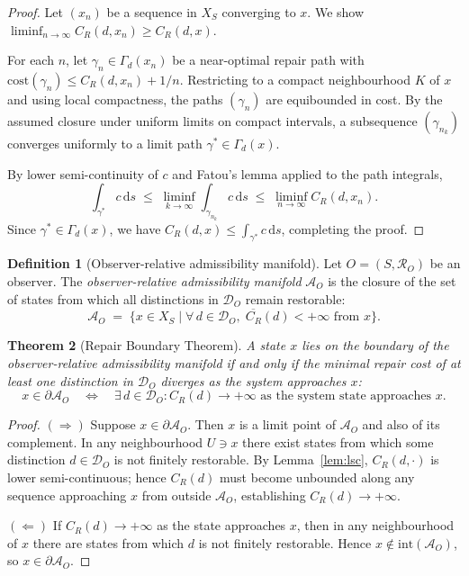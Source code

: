 \documentclass[12pt, oneside]{article}
\theoremstyle{plain}
\newtheorem{theorem}{Theorem}[section]
\theoremstyle{definition}
\newtheorem{definition}[theorem]{Definition}
\theoremstyle{remark}
\theoremstyle{definition}
\newcommand{\CR}{C_{\!R}}
\newcommand{\AO}{\mathcal{A}_O}
\newcommand{\DO}{\mathcal{D}_O}
\newcommand{\bA}{\partial\mathcal{A}}
\newcommand{\Xsub}{X_S}
\begin{document}
\begin{proof}
  Let $(x_n)$ be a sequence in $\Xsub$ converging to $x$.
  We show $\liminf_{n \to \infty} \CR(d, x_n) \geq \CR(d, x)$.

  For each $n$, let $\gamma_n \in \Gamma_d(x_n)$ be a near-optimal
  repair path with
  $\mathrm{cost}(\gamma_n) \leq \CR(d, x_n) + 1/n$.
  Restricting to a compact neighbourhood $K$ of $x$ and using
  local compactness, the paths $(\gamma_n)$ are equibounded in cost.
  By the assumed closure under uniform limits on compact intervals,
  a subsequence $(\gamma_{n_k})$ converges uniformly to a limit path
  $\gamma^* \in \Gamma_d(x)$.

  By lower semi-continuity of $c$ and Fatou's lemma applied to the
  path integrals,
  \[
    \int_{\gamma^*} c\, \mathrm{d}s
    \;\leq\;
    \liminf_{k \to \infty}
    \int_{\gamma_{n_k}} c\, \mathrm{d}s
    \;\leq\;
    \liminf_{n \to \infty} \CR(d, x_n).
  \]
  Since $\gamma^* \in \Gamma_d(x)$, we have
  $\CR(d, x) \leq \int_{\gamma^*} c\, \mathrm{d}s$,
  completing the proof.
\end{proof}

\begin{definition}[Observer-relative admissibility manifold]
  Let $O = (S, \mathcal{R}_O)$ be an observer.
  The \emph{observer-relative admissibility manifold} $\AO$ is the
  closure of the set of states from which all distinctions in $\DO$
  remain restorable:
  \[
    \AO
    \;=\;
    \overline{\bigl\{
      x \in \Xsub
      \;\big|\;
      \forall\, d \in \DO,\;
      \CR(d) < +\infty \text{ from } x
    \bigr\}}.
  \]
\end{definition}

\begin{theorem}[Repair Boundary Theorem]
  A state $x$ lies on the boundary of the observer-relative
  admissibility manifold if and only if the minimal repair cost of at
  least one distinction in $\DO$ diverges as the system approaches $x$:
  \[
    x \in \bA_O
    \quad\Longleftrightarrow\quad
    \exists\, d \in \DO : \CR(d) \to +\infty
    \text{ as the system state approaches } x.
  \]
  \label{thm:repair-boundary}
\end{theorem}

\begin{proof}
  $(\Rightarrow)$\; Suppose $x \in \bA_O$.
  Then $x$ is a limit point of $\AO$ and also of its complement.
  In any neighbourhood $U \ni x$ there exist states from which some
  distinction $d \in \DO$ is not finitely restorable.
  By Lemma~\ref{lem:lsc}, $\CR(d, \cdot)$ is lower semi-continuous;
  hence $\CR(d)$ must become unbounded along any sequence approaching
  $x$ from outside $\AO$, establishing $\CR(d) \to +\infty$.

  $(\Leftarrow)$\; If $\CR(d) \to +\infty$ as the state approaches
  $x$, then in any neighbourhood of $x$ there are states from which
  $d$ is not finitely restorable.
  Hence $x \notin \mathrm{int}(\AO)$, so $x \in \bA_O$.
\end{proof}
\end{document}
